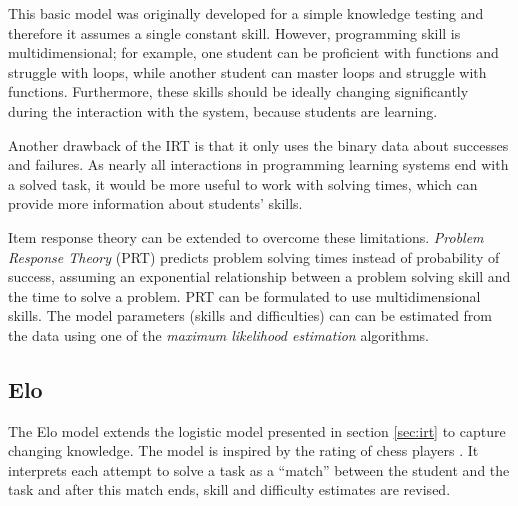 This basic model was originally developed for a simple knowledge testing
  and therefore it assumes a single constant skill.
However, programming skill is multidimensional;
  for example, one student can be proficient with functions and struggle with loops,
  while another student can master loops and struggle with functions.
Furthermore, these skills should be ideally changing significantly during
  the interaction with the system, because students are learning.

Another drawback of the IRT is that it only uses
  the binary data about successes and failures.
As nearly all interactions in programming learning systems end with a solved task,
  it would be more useful to work with solving times,
  which can provide more information about students' skills.

Item response theory can be extended to overcome these limitations.
\emph{Problem Response Theory} (PRT)
\cite{alg.problem-response-theory, pelanek-student-modeling-times}
predicts problem solving times instead of probability of success,
assuming an exponential relationship between a problem solving skill
and the time to solve a problem.
PRT can be formulated to use multidimensional skills.
The model parameters (skills and difficulties) can can be estimated from the data
  using one of the \emph{maximum likelihood estimation} algorithms.





\subsection{Elo}
\label{sec:elo}

The Elo model \cite{alg.elo}
  extends the logistic model presented in section \ref{sec:irt}
  to capture changing knowledge.
The model is inspired by the rating of chess players \cite{elo-rating}.
It interprets each attempt  to solve a task
  as a ``match'' between the student and the task
  and after this match ends, skill and difficulty estimates are revised.


